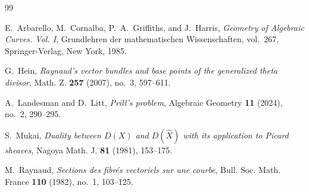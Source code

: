 \documentclass[a4paper]{amsart}
\theoremstyle{remark}
\begin{document}
\begin{thebibliography}{99}

E.~Arbarello, M.~Cornalba, P.~A.~Griffiths, and J.~Harris,
\emph{Geometry of Algebraic Curves. Vol. I},
Grundlehren der mathematischen Wissenschaften, vol.~267,
Springer-Verlag, New York, 1985.

G.~Hein,
\emph{Raynaud's vector bundles and base points of the generalized theta divisor},
Math. Z. \textbf{257} (2007), no.~3, 597--611.

A.~Landesman and D.~Litt,
\emph{Prill's problem},
Algebraic Geometry \textbf{11} (2024), no.~2, 290--295.

S.~Mukai,
\emph{Duality between \(D(X)\) and \(D(\widehat X)\) with its application to Picard sheaves},
Nagoya Math. J. \textbf{81} (1981), 153--175.

M.~Raynaud,
\emph{Sections des fibr\'es vectoriels sur une courbe},
Bull. Soc. Math. France \textbf{110} (1982), no.~1, 103--125.

\end{thebibliography}
\end{document}
